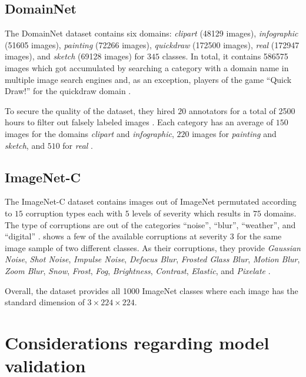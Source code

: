 \subsection{DomainNet}

The DomainNet dataset \citep{PengBXHSW19} contains six domains: \emph{clipart} (\num{48129} images), \emph{infographic} (\num{51605} images), \emph{painting} (\num{72266} images), \emph{quickdraw} (\num{172500} images), \emph{real} (\num{172947} images), and \emph{sketch} (\num{69128} images) for $345$ classes. In total, it contains \num{586575} images  which got accumulated by searching a category with a domain name in multiple image search engines and, as an exception, players of the game ``Quick Draw!'' for the quickdraw domain \citep{PengBXHSW19}.

To secure the quality of the dataset, they hired $20$ annotators for a total of \num{2500} hours to filter out falsely labeled images \citep{PengBXHSW19}. Each category has an average of $150$ images for the domains \emph{clipart} and \emph{infographic}, $220$ images for \emph{painting} and \emph{sketch}, and $510$ for \emph{real} \citep{PengBXHSW19}.

\subsection{ImageNet-C}
The ImageNet-C dataset \citep{HendrycksD19} contains images out of ImageNet \citep{RussakovskyDSKS15} permutated according to $15$ corruption types each with $5$ levels of severity which results in $75$ domains. The type of corruptions are out of the categories ``noise'', ``blur'', ``weather'', and ``digital'' \citep{HendrycksD19}.  shows a few of the available corruptions at severity $3$ for the same image sample of two different classes. As their corruptions, they provide \emph{Gaussian Noise}, \emph{Shot Noise}, \emph{Impulse Noise}, \emph{Defocus Blur}, \emph{Frosted Glass Blur}, \emph{Motion Blur}, \emph{Zoom Blur}, \emph{Snow}, \emph{Frost}, \emph{Fog}, \emph{Brightness}, \emph{Contrast}, \emph{Elastic}, and \emph{Pixelate} \citep{HendrycksD19}. 

Overall, the dataset provides all \num{1000} ImageNet classes where each image has the standard dimension of $3 \times 224 \times 224$.

\section{Considerations regarding model validation}
\label{sec:considerations}

